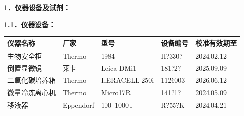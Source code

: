\documentclass[UTF8,10pt,a4paper,fontset=fandol]{ctexart}
\newcommand{\fieldvalue}[1]{#1}
\newcommand{\handwritten}[1]{#1}
\begin{document}
\textbf{1．仪器设备及试剂：}

\textbf{1.1．仪器设备：}

\small
\begin{tabularx}{\textwidth}{|X|X|X|X|X|}
\hline
仪器名称 & 厂家 & 型号 & 设备编号 & 校准有效期至 \\ \hline
\fieldvalue{生物安全柜} &
\fieldvalue{Thermo} &
\fieldvalue{\handwritten{1984}} &
\fieldvalue{\handwritten{H?330?}} &
\fieldvalue{\handwritten{2024.02.12}}
\\ \hline
\fieldvalue{倒置显微镜} &
\fieldvalue{莱卡} &
\fieldvalue{Leica DMi1} &
\fieldvalue{\handwritten{181?2?}} &
\fieldvalue{\handwritten{2025.09.09}}
\\ \hline
\fieldvalue{二氧化碳培养箱} &
\fieldvalue{Thermo} &
\fieldvalue{HERACELL 250i} &
\fieldvalue{\handwritten{1126003}} &
\fieldvalue{\handwritten{2026.06.12}}
\\ \hline
\fieldvalue{微量冷冻离心机} &
\fieldvalue{Thermo} &
\fieldvalue{Micro17R} &
\fieldvalue{\handwritten{141?1?}} &
\fieldvalue{\handwritten{2024.05.09}}
\\ \hline
\fieldvalue{移液器} &
\fieldvalue{Eppendorf} &
\fieldvalue{\handwritten{100--1000\,\textmu l}} &
\fieldvalue{\handwritten{R?55?K}} &
\fieldvalue{\handwritten{2024.04.21}}
\\ \hline
\end{tabularx}
\normalsize
\end{document}
